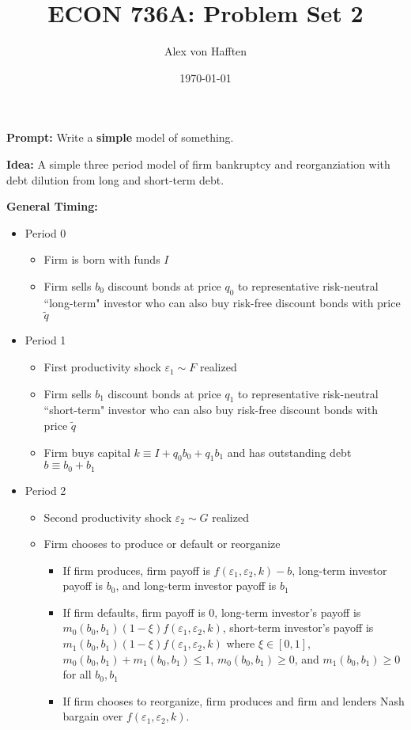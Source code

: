 \documentclass{article}
\title{ECON 736A: Problem Set 2}
\author{Alex von Hafften}
\date{\today}
\begin{document}
\maketitle

\textbf{Prompt:} Write a \textbf{simple} model of something.

\bigskip

\textbf{Idea:} A simple three period model of firm bankruptcy and reorganziation with debt dilution from long and short-term debt.

\bigskip

\textbf{General Timing:}

\begin{itemize}
\item Period 0
\begin{itemize}
\item Firm is born with funds $I$
\item Firm sells $b_0$ discount bonds at price $q_0$ to representative risk-neutral ``long-term" investor who can also buy risk-free discount bonds with price $\tilde q$
\end{itemize}
\item Period 1
\begin{itemize}
\item First productivity shock $\varepsilon_1 \sim F$ realized
\item Firm sells $b_1$ discount bonds at price $q_1$ to representative risk-neutral ``short-term" investor who can also buy risk-free discount bonds with price $\tilde q$
\item Firm buys capital $k \equiv I + q_0 b_0 + q_1 b_1$ and has outstanding debt $b \equiv b_0 + b_1$
\end{itemize}
\item Period 2
\begin{itemize}
\item Second productivity shock $\varepsilon_2 \sim G$ realized
\item Firm chooses to produce or default or reorganize
\begin{itemize}
\item If firm produces, firm payoff is $f(\varepsilon_1, \varepsilon_2, k) - b$, long-term investor payoff is $b_0$, and long-term investor payoff is $b_1$
\item If firm defaults, firm payoff is 0, long-term investor's payoff is $m_0(b_0, b_1) (1-\xi) f(\varepsilon_1, \varepsilon_2, k)$, short-term investor's payoff is $m_1(b_0, b_1) (1-\xi) f(\varepsilon_1, \varepsilon_2, k)$ where $\xi \in [0,1]$, $m_0(b_0,b_1) + m_1(b_0, b_1) \le 1$, $m_0(b_0,b_1) \ge 0$, and $m_1(b_0, b_1) \ge 0$ for all $b_0, b_1$
\item If firm chooses to reorganize, firm produces and firm and lenders Nash bargain over $f(\varepsilon_1, \varepsilon_2, k)$.
\end{itemize}
\end{itemize}
\end{itemize}
\end{document}
